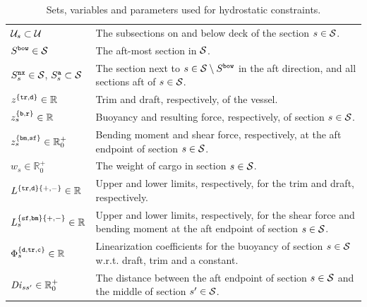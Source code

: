\begin{table}[width=.9\linewidth,cols=2,pos=htbp]
\caption{Sets, variables and parameters used for hydrostatic constraints.}\label{tab:hydro}
\begin{tabular*}{\tblwidth}{@{} Lp{12cm} @{}}
\toprule
$\mathcal{U}_s\subset\mathcal{U}$								& The subsections on and below deck of the section $s\in\mathcal{S}$.\\
$S^\texttt{bow}\in\mathcal{S}$								& The aft-most section in $\mathcal{S}$.\\
$S^\texttt{nx}_s\in\mathcal{S}$, $S^\texttt{a}_s\subset\mathcal{S}$	& The section next to $s\in\mathcal{S}\setminus S^\texttt{bow}$ in the aft direction, and all sections aft of $s\in\mathcal{S}$.\\
\midrule
$z^{\{\texttt{tr},\texttt{d}\}}\in\mathbb{R}$ 			& Trim and draft, respectively, of the vessel.\\
$z^{\{\texttt{b},\texttt{r}\}}_{s}\in \mathbb{R}$			& Buoyancy and resulting force, respectively, of section $s\in\mathcal{S}$.\\
$z^{\{\texttt{bm},\texttt{sf}\}}_{s}\in \mathbb{R}^+_0$	& Bending moment and shear force, respectively, at the aft endpoint of section $s\in\mathcal{S}$.\\
$w_{s} \in\mathbb{R}^+_0$							& The weight of cargo in section $s\in\mathcal{S}$.\\
\midrule
$L^{\{\texttt{tr},\texttt{d}\}\{+,-\}}\in\mathbb{R}$			& Upper and lower limits, respectively, for the trim and draft, respectively.\\
$L^{\{\texttt{sf},\texttt{bm}\}\{+,-\}}_{s}\in\mathbb{R}$		& Upper and lower limits, respectively, for the shear force and bending moment at the aft endpoint of section $s\in\mathcal{S}$.\\
$\Phi^{\{\texttt{d},\texttt{tr},\texttt{c}\}}_{s}\in\mathbb{R}$	& Linearization coefficients for the buoyancy of section $s\in \mathcal{S}$ w.r.t. draft, trim and a constant.\\
$\mathit{Di}_{ss'}\in \mathbb{R}^+_0$						& The distance between the aft endpoint of section $s\in\mathcal{S}$ and the middle of section $s'\in\mathcal{S}$.\\
\bottomrule
\end{tabular*}
\end{table}

